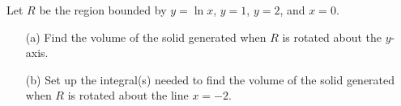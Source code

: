 \documentclass[12pt]{article}
\begin{document}
\Example Let $R$ be the region bounded by $y=\ln x$, $y=1$, $y=2$, and $x=0$.

\begin{itemize}
\item[(a)] Find the volume of the solid generated when $R$ is rotated about the $y$-axis.

\vspace{90mm}

\item[(b)] Set up the integral(s) needed to find the volume of the solid generated when $R$ is rotated about the line $x=-2$.
\end{itemize}

\vfill

\end{document}
